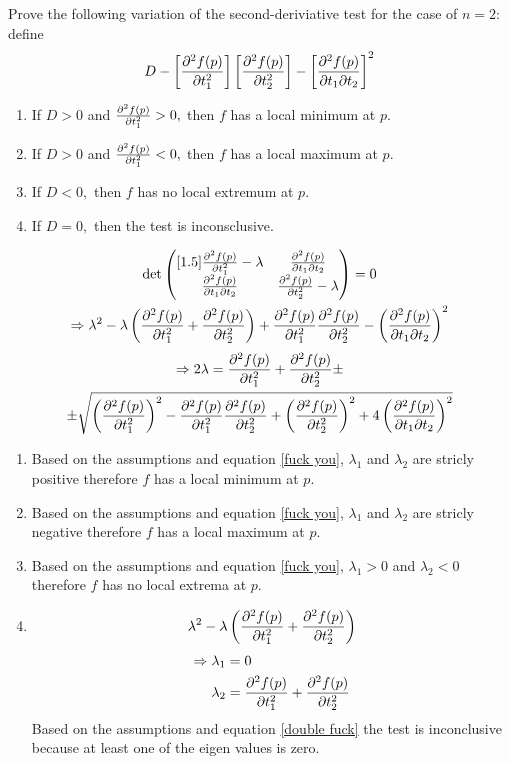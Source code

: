 Prove the following variation of the second-deriviative test for the case of $n=2:$ define
\[
D - \left[\frac{\partial^2f(p)}{\partial t_1^2}\right]\left[\frac{\partial^2f(p)}{\partial t_2^2}\right]-\left[\frac{\partial^2f(p)}{\partial t_1 \partial t_2}\right]^2
\]
\begin{enumerate}
\item If $D > 0$ and $\frac{\partial^2f(p)}{\partial t_1^2} >0,$ then $f$ has a local minimum at $p.$
\item If $D > 0$ and $\frac{\partial^2f(p)}{\partial t_1^2} <0,$ then $f$ has a local maximum at $p.$
\item If $D < 0,$ then $f$ has no local extremum at $p.$
\item If $D = 0,$ then the test is inconsclusive.
\end{enumerate}
\begin{gather}
\det{
\begin{pmatrix}[1.5]
\frac{\partial^2f(p)}{\partial t_1^2}-\lambda & \frac{\partial^2f(p)}{\partial t_1 \partial t_2}\\
\frac{\partial^2f(p)}{\partial t_1 \partial t_2}& \frac{\partial^2f(p)}{\partial t_2^2}- \lambda
\end{pmatrix}} = 0\\
\Rightarrow \lambda^2 - \lambda\left(\frac{\partial^2f(p)}{\partial t_1^2} + \frac{\partial^2f(p)}{\partial t_2^2}\right) + \frac{\partial^2f(p)}{\partial t_1^2}\frac{\partial^2f(p)}{\partial t_2^2} -\left(\frac{\partial^2f(p)}{\partial t_1 \partial t_2}\right)^2
\end{gather}
\begin{multline}
\label{fuck you}
\implies 2\lambda = \a + \b \pm\\ \pm \sqrt{\left(\a\right)^2-\a\b+\left(\b\right)^2+4\left(\c\right)^2}
\end{multline}
\begin{enumerate}
\item Based on the assumptions and equation \ref{fuck you},
  $\lambda_1$ and $\lambda_2$ are stricly positive therefore $f$ has
  a local minimum at $p.$
\item Based on the assumptions and equation \ref{fuck you},
  $\lambda_1$ and $\lambda_2$ are stricly negative therefore $f$ has
  a local maximum at $p.$
\item Based on the assumptions and equation \ref{fuck you},
  $\lambda_1>0$ and $\lambda_2<0$ therefore $f$ has no local extrema
  at $p.$
\item 
\begin{equation}
\lambda^2 -\lambda\left(\frac{\partial^2f(p)}{\partial t_1^2} +\frac{\partial^2f(p)}{\partial t_2^2}\right)
\end{equation}
\begin{align}
\label{double fuck} \Rightarrow \lambda_1 &= 0\\
\lambda_2 &= \frac{\partial^2f(p)}{\partial t_1^2} + \frac{\partial^2f(p)}{\partial t_2^2}
\end{align}
Based on the assumptions and equation \ref{double fuck} the test is
inconclusive because at least one of the eigen values is zero.
\end{enumerate}
